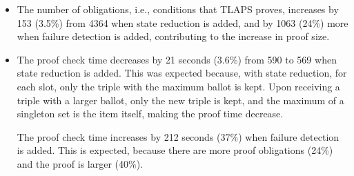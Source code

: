 \documentclass[11pt]{article}
\begin{document}
\begin{itemize}
\item The number of obligations, i.e., conditions that TLAPS proves,
  increases by 153 (3.5\%) from 4364 when state reduction is added, and by
  1063 (24\%) more when failure detection is added, contributing to the
  increase in proof size.
    
\item The proof check time decreases by 21 seconds (3.6\%) from 590 to 569
  when state reduction is added. This was expected because, with state
  reduction, for each slot, only the triple with the maximum ballot is
  kept. Upon receiving a triple with a larger ballot,
  only the new triple is kept, 
  and the maximum of a singleton set is the item itself, %
  making the proof time decrease.
    
  The proof check time increases by 212 seconds (37\%) when failure
  detection is added.  This is expected, because there are more proof
  obligations (24\%) and the proof is larger (40\%).
\end{itemize}
\end{document}

